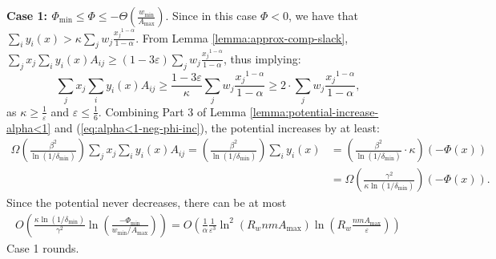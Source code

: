 \documentclass[11pt]{article}
\makeatletter
\newcommand{\wratio}{R_w}
\newenvironment{proofof}[1]{\par
  \pushQED{\qed}\normalfont \topsep3\p@\relax
  \trivlist
  \item[\hskip\labelsep
        \bfseries
    Proof of #1\@addpunct{.}]\ignorespaces
}{\popQED\endtrivlist\@endpefalse
}
\makeatother
\begin{document}
\begin{proofof}{Theorem \ref{thm:convergence-alpha<1}}
\noindent \textbf{Case 1: $\Phi_{\min}\leq \Phi \leq -\Theta(\frac{ w_{\min}}{A_{\max}})$}. Since in this case $\Phi < 0$, we have that $\sum_i y_i(x) > \kappa \sum_j w_j \frac{{x_j}^{1-\alpha}}{1-\alpha}$. From Lemma \ref{lemma:approx-comp-slack}, $\sum_j x_j \sum_i y_i(x)A_{ij}\geq (1-3\varepsilon)\sum_j w_j \frac{{x_j}^{1-\alpha}}{1-\alpha}$, thus implying: 
\begin{equation}\sum_j x_j \sum_i y_i(x)A_{ij}\geq \frac{1-3\varepsilon}{\kappa}\sum_j w_j \frac{{x_j}^{1-\alpha}}{1-\alpha}\geq 2\cdot\sum_j w_j \frac{{x_j}^{1-\alpha}}{1-\alpha}, \label{eq:alpha<1-neg-phi-inc}
\end{equation}
as $\kappa \geq \frac{1}{\varepsilon}$ and $\varepsilon\leq \frac{1}{6}$. Combining Part 3 of Lemma \ref{lemma:potential-increase-alpha<1} and (\ref{eq:alpha<1-neg-phi-inc}), the potential increases by at least:
\begin{align*}
\Omega\left(\frac{\beta^2}{\ln(1/\delta_{\min})}\right)\sum_jx_j \sum_i y_i(x) A_{ij} = \left(\frac{\beta^2}{\ln(1/\delta_{\min})}\right)\sum_i y_i(x) &= \left(\frac{\beta^2}{\ln(1/\delta_{\min})}\cdot\kappa\right)(-\Phi(x)) \\
&= \Omega\left(\frac{\gamma^2}{\kappa \ln(1/\delta_{\min})}\right)(-\Phi(x)).
\end{align*}
Since the potential never decreases, there can be at most 
\begin{align*}
O\left(\frac{\kappa\ln(1/\delta_{\min})}{\gamma^2}\ln\left(\frac{-\Phi_{\min}}{ w_{\min}/A_{\max}}\right)\right) = O\left(\frac{1}{\alpha}\frac{1}{\varepsilon^3}\ln^2\left(\wratio nmA_{\max}\right)\ln\left(\wratio\frac{nmA_{\max}}{\varepsilon}\right)\right)
\end{align*}
Case 1 rounds.


\end{proofof}
\end{document}
